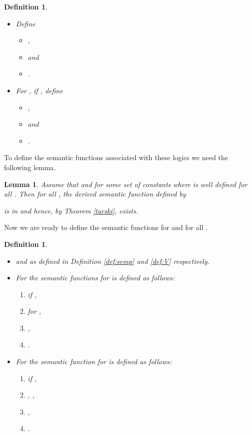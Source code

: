 \documentclass[submission]{eptcs}
\newtheorem{lemma}[theorem]{Lemma}
\newtheorem{definition}[theorem]{Definition}
\begin{document}
\begin{definition}\quad \begin{itemize}
\item Define 
\begin{itemize}
\item
, 
\item  and
\item .
\end{itemize}
\item For , if , define
\begin{itemize}
 \item ,
\item  and
\item .
\end{itemize}
\end{itemize}
\end{definition}


To define the semantic functions associated with these logics we need the
following lemma.
\begin{lemma}\label{L:logic}\quad
  Assume that  and  for some set
  of constants  where  is well defined for
  all .  Then for all , the derived semantic
  function  defined by

 is in  and hence, by Theorem
 \ref{tarski}, 
 exists.
\end{lemma}

Now we are ready to define the semantic functions
for  and  for all .
\begin{definition}\quad
\begin{itemize}
\item  and  as defined in Definition
  \ref{def:semp} and \ref{def:V} respectively.

\item For  the semantic functions for  is  defined as follows:
\begin{enumerate}
\item 
 if ,
\item
 for ,
\item
  ,
\item
  .
\end{enumerate}
\item For  the semantic function for  is defined as follows:
\begin{enumerate}
\item  if ,
\item 
  , ,
\item ,
\item
  . 
\end{enumerate}
\end{itemize}

\end{definition}
\iffalse
\begin{definition}\quad
  Given a finite index set  and a sequence of nested declarations
   we define
\begin{itemize}
  
\item  and 
\item  if  for
  .
\end{itemize}
Sometimes we write  in stead of  if the
meaning is clear from the context.
\end{definition}\fi
\end{document}
